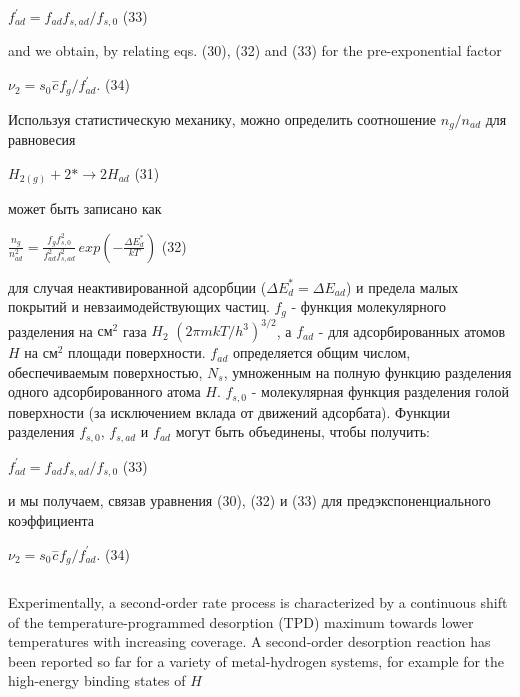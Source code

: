 \documentclass[11pt]{article}
\makeatletter
\newcommand{\boxspacing}{\kern\kvtcb@left@rule\kern\kvtcb@boxsep}
\newcommand{\prompt}[4]{
        {\ttfamily\llap{{\color{#2}[#3]:\hspace{3pt}#4}}\vspace{-\baselineskip}}
    }
\makeatother
\begin{document}
\(f_{ad}^{\prime} = f_{ad} f_{s,ad}/f_{s,0}\) (33)

and we obtain, by relating eqs. (30), (32) and (33) for the
pre-exponential factor

\(\nu_2 = s_0 \overset{-}c f_g/f_{ad}^{\prime}\). (34)

    Используя статистическую механику, можно определить соотношение
\(n_g/n_{ad}\) для равновесия

\(H_{2(g)} + 2 * {\rightarrow} 2 H_{ad}\) (31)

может быть записано как

\(\frac{n_g}{n_{ad}^2} = \frac{f_g f_{s,0}^2}{f_{ad}^2 f_{s,ad}^2} \, exp \left(-\frac{\Delta E^{*}_{d}}{kT} \right)\)
(32)

для случая неактивированной адсорбции
(\(\Delta E^{*}_{d} = \Delta E_{ad}\)) и предела малых покрытий и
невзаимодействующих частиц. \(f_g\) - функция молекулярного разделения
на \(см^2\) газа \(H_2\) \((2 \pi m k T/h^3)^{3/2}\), а \(f_{ad}\) - для
адсорбированных атомов \(H\) на \(см^2\) площади поверхности. \(f_{ad}\)
определяется общим числом, обеспечиваемым поверхностью, \(N_s\),
умноженным на полную функцию разделения одного адсорбированного атома
\(H\). \(f_{s,0}\) - молекулярная функция разделения голой поверхности
(за исключением вклада от движений адсорбата). Функции разделения
\(f_{s,0}\), \(f_{s,ad}\) и \(f_{ad}\) могут быть объединены, чтобы
получить:

\(f_{ad}^{\prime} = f_{ad} f_{s,ad}/f_{s,0}\) (33)

и мы получаем, связав уравнения (30), (32) и (33) для
предэкспоненциального коэффициента

\(\nu_2 = s_0 \overset{-}c f_g/f_{ad}^{\prime}\). (34)

    \begin{tcolorbox}[breakable, size=fbox, boxrule=1pt, pad at break*=1mm,colback=cellbackground, colframe=cellborder]
\prompt{In}{incolor}{ }{\boxspacing}
\begin{Verbatim}[commandchars=\\\{\}]

\end{Verbatim}
\end{tcolorbox}

    Experimentally, a second-order rate process is characterized by a
continuous shift of the temperature-programmed desorption (TPD) maximum
towards lower temperatures with increasing coverage. A second-order
desorption reaction has been reported so far for a variety of
metal-hydrogen systems, for example for the high-energy binding states
of \(H\)
\end{document}

